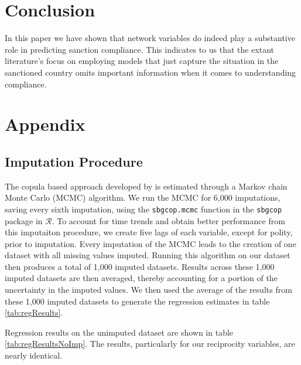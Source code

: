\section*{Conclusion}
\label{conclusion}

In this paper we have shown that network variables do indeed play a substantive role in predicting sanction compliance. This indicates to us that the extant literature's focus on employing models that just capture the situation in the sanctioned country omits important information when it comes to understanding compliance. 


\newpage
\section*{Appendix}
\label{appendix}

\subsection*{Imputation Procedure}

The copula based approach developed by \citet{hoff:2007} is estimated through a Markov chain Monte Carlo (MCMC) algorithm. We run the MCMC for 6,000 imputations, saving every sixth imputation, using the \texttt{sbgcop.mcmc} function in the \texttt{sbgcop} package in $\mathcal{R}$. To account for time trends and obtain better performance from this imputaiton procedure, we create five lags of each variable, except for polity, prior to imputation. Every imputation of the MCMC leads to the creation of one dataset with all missing values imputed. Running this algorithm on our dataset then produces a total of 1,000 imputed datasets. Results across these 1,000 imputed datasets are then averaged, thereby accounting for a portion of the uncertainty in the imputed values. We then used the average of the results from these 1,000 imputed datasets to generate the regression estimates in table \ref{tab:regResults}. 

Regression results on the unimputed dataset are shown in table \ref{tab:regResultsNoImp}. The results, particularly for our reciprocity variables, are nearly identical. 


\FloatBarrier

\newpage